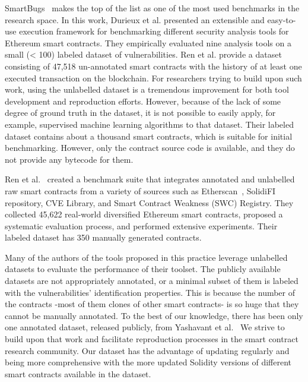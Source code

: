     SmartBugs~\cite{Empirical-Review-of-Automated-Analysis-Tools-on-47587-Ethereum-Smart-Contracts} makes the top of the list as one of the most used benchmarks in the research space.
    In this work, Durieux et al. presented an extensible and easy-to-use execution framework for benchmarking different security analysis tools for Ethereum smart contracts.
    They empirically evaluated nine analysis tools on a small (< 100) labeled dataset of vulnerabilities.
    Ren et al. provide a dataset consisting of 47,518 un-annotated smart contracts with the history of at least one executed transaction on the blockchain.
    For researchers trying to build upon such work, using the unlabelled dataset is a tremendous improvement for both tool development and reproduction efforts. However, because of the lack of some degree of ground truth in the dataset, it is not possible to easily apply, for example, supervised machine learning algorithms to that dataset.
    Their labeled dataset contains about a thousand smart contracts, which is suitable for initial benchmarking. However, only the contract source code is available, and they do not provide any bytecode for them.

    Ren et al.~\cite{Empirical-Evaluation-of-Smart-Contract-Testing:What-is-the-Best-Choice} created a benchmark suite that integrates annotated and unlabelled raw smart contracts from a variety of sources
    such as Etherscan~\cite{etherscan}, SolidiFI repository, CVE Library, and Smart Contract Weakness (SWC) Registry.
    They collected 45,622 real-world diversified Ethereum smart contracts, proposed a systematic evaluation process, and performed extensive experiments.
    Their labeled dataset has 350 manually generated contracts.

    Many of the authors of the tools proposed in this practice leverage unlabelled datasets to evaluate the performance of their toolset.
    The publicly available datasets are not appropriately annotated, or a minimal subset of them is labeled with the vulnerabilities' identification properties.
    This is because the number of the contracts -most of them clones of other smart contracts- is so huge that they cannot be manually annotated.
    To the best of our knowledge, there has been only one annotated dataset, released publicly, from Yashavant et al.~\cite{yashavant2022scrawld}
    We strive to build upon that work and facilitate reproduction processes in the smart contract research community.
    Our dataset has the advantage of updating regularly and being more comprehensive with the more updated Solidity versions of different smart contracts available in the dataset.

